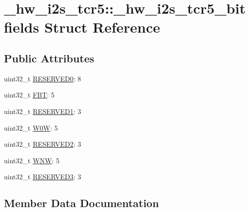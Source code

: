 \hypertarget{struct__hw__i2s__tcr5_1_1__hw__i2s__tcr5__bitfields}{}\section{\+\_\+hw\+\_\+i2s\+\_\+tcr5\+:\+:\+\_\+hw\+\_\+i2s\+\_\+tcr5\+\_\+bitfields Struct Reference}
\label{struct__hw__i2s__tcr5_1_1__hw__i2s__tcr5__bitfields}
\subsection*{Public Attributes}
\begin{DoxyCompactItemize}
\item 
uint32\+\_\+t \hyperlink{struct__hw__i2s__tcr5_1_1__hw__i2s__tcr5__bitfields_adc89e553623813da24b157549d357c1f}{R\+E\+S\+E\+R\+V\+E\+D0}\+: 8
\item 
uint32\+\_\+t \hyperlink{struct__hw__i2s__tcr5_1_1__hw__i2s__tcr5__bitfields_a163938e4cf79b0227eedda02c66512f4}{F\+BT}\+: 5
\item 
uint32\+\_\+t \hyperlink{struct__hw__i2s__tcr5_1_1__hw__i2s__tcr5__bitfields_aef1bbb44ce5a3ffbcb369785913b3e0f}{R\+E\+S\+E\+R\+V\+E\+D1}\+: 3
\item 
uint32\+\_\+t \hyperlink{struct__hw__i2s__tcr5_1_1__hw__i2s__tcr5__bitfields_a93e2c33798b1c534f727582d9fe320c3}{W0W}\+: 5
\item 
uint32\+\_\+t \hyperlink{struct__hw__i2s__tcr5_1_1__hw__i2s__tcr5__bitfields_a5c7307032142090cfe6ffa5c898526eb}{R\+E\+S\+E\+R\+V\+E\+D2}\+: 3
\item 
uint32\+\_\+t \hyperlink{struct__hw__i2s__tcr5_1_1__hw__i2s__tcr5__bitfields_a858f3ebf11e1d3a07373fcaafc40cd1a}{W\+NW}\+: 5
\item 
uint32\+\_\+t \hyperlink{struct__hw__i2s__tcr5_1_1__hw__i2s__tcr5__bitfields_aca37e8927a5c7ffa46a83bfe2f062ccd}{R\+E\+S\+E\+R\+V\+E\+D3}\+: 3
\end{DoxyCompactItemize}


\subsection{Member Data Documentation}
